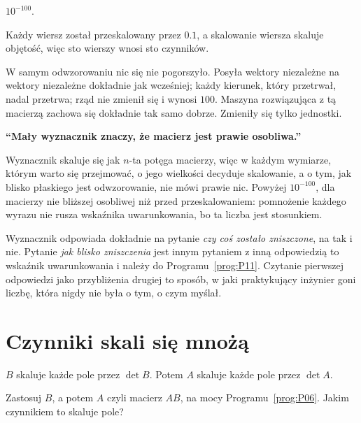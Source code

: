 \begin{fr}
\begin{ansblock}
$10^{-100}$.
\end{ansblock}

Każdy wiersz został przeskalowany przez $\num{0.1}$, a skalowanie wiersza
skaluje objętość, więc sto wierszy wnosi sto czynników.

W samym odwzorowaniu nic się nie pogorszyło. Posyła wektory niezależne na
wektory niezależne dokładnie jak wcześniej; każdy kierunek, który przetrwał,
nadal przetrwa; rząd nie zmienił się i wynosi $100$. Maszyna rozwiązująca z tą
macierzą zachowa się dokładnie tak samo dobrze. Zmieniły się tylko jednostki.
\end{fr}

\begin{trapbox}
\textbf{\enquote{Mały wyznacznik znaczy, że macierz jest prawie osobliwa.}}

Wyznacznik skaluje się jak $n$-ta potęga macierzy, więc w każdym wymiarze,
którym warto się przejmować, o jego wielkości decyduje skalowanie, a o tym, jak
blisko płaskiego jest odwzorowanie, nie mówi prawie nic. Powyżej $10^{-100}$,
dla macierzy nie bliższej osobliwej niż przed przeskalowaniem: pomnożenie
każdego wyrazu nie rusza wskaźnika uwarunkowania, bo ta liczba jest
stosunkiem.

Wyznacznik odpowiada dokładnie na pytanie \emph{czy coś zostało zniszczone}, na
tak i nie. Pytanie \emph{jak blisko zniszczenia} jest innym pytaniem z inną
odpowiedzią \dash{} to wskaźnik uwarunkowania i należy do
Programu~\ref{prog:P11}. Czytanie pierwszej odpowiedzi jako przybliżenia
drugiej to sposób, w jaki praktykujący inżynier goni liczbę, która nigdy nie
była o tym, o czym myślał.
\end{trapbox}

\section{Czynniki skali się mnożą}
\label{sec:P09-product}

\begin{fr}
$B$ skaluje każde pole przez $\det B$. Potem $A$ skaluje każde pole przez
$\det A$.

Zastosuj $B$, a potem $A$ \dash{} czyli macierz $AB$, na mocy
Programu~\ref{prog:P06}. Jakim czynnikiem to skaluje pole?
\dotline
\nextframe
\end{fr}

